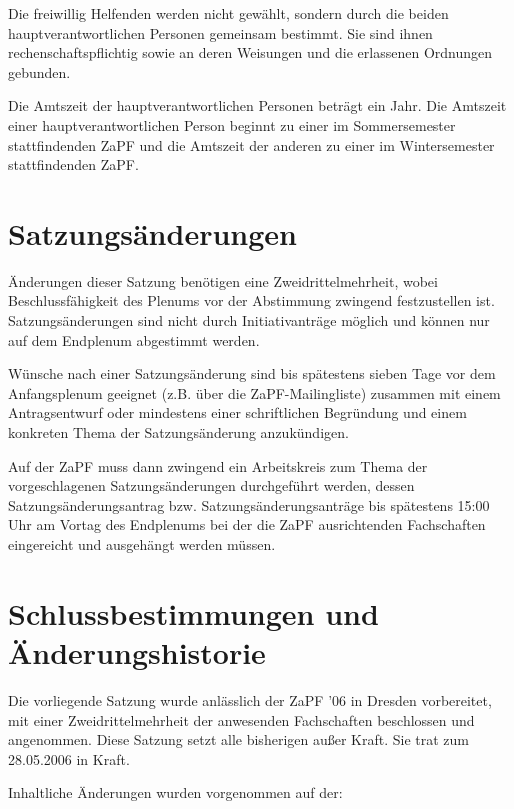 \documentclass[
  a4paper,
  oneside]{scrartcl}
\begin{document}
Die freiwillig Helfenden werden nicht gewählt, sondern durch die beiden
hauptverantwortlichen Personen gemeinsam bestimmt. Sie sind ihnen
rechenschaftspflichtig sowie an deren Weisungen und die erlassenen
Ordnungen gebunden.

Die Amtszeit der hauptverantwortlichen Personen beträgt ein Jahr. Die
Amtszeit einer hauptverantwortlichen Person beginnt zu einer im
Sommersemester stattfindenden ZaPF und die Amtszeit der anderen zu einer
im Wintersemester stattfindenden ZaPF.

\section{Satzungsänderungen}\label{satzungsuxe4nderungen}

Änderungen dieser Satzung benötigen eine Zweidrittelmehrheit, wobei
Beschlussfähigkeit des Plenums vor der Abstimmung zwingend festzustellen
ist. Satzungsänderungen sind nicht durch Initiativanträge möglich und
können nur auf dem Endplenum abgestimmt werden.

Wünsche nach einer Satzungsänderung sind bis spätestens sieben Tage vor
dem Anfangsplenum geeignet (z.B. über die ZaPF-Mailingliste) zusammen
mit einem Antragsentwurf oder mindestens einer schriftlichen Begründung
und einem konkreten Thema der Satzungsänderung anzukündigen.

Auf der ZaPF muss dann zwingend ein Arbeitskreis zum Thema der
vorgeschlagenen Satzungsänderungen durchgeführt werden, dessen
Satzungsänderungsantrag bzw. Satzungsänderungsanträge bis spätestens
15:00 Uhr am Vortag des Endplenums bei der die ZaPF ausrichtenden
Fachschaften eingereicht und ausgehängt werden müssen.

\section*{Schlussbestimmungen und
Änderungshistorie}\label{schlussbestimmungen-und-uxe4nderungshistorie}

Die vorliegende Satzung wurde anlässlich der ZaPF '06 in Dresden
vorbereitet, mit einer Zweidrittelmehrheit der anwesenden Fachschaften
beschlossen und angenommen. Diese Satzung setzt alle bisherigen außer
Kraft. Sie trat zum 28.05.2006 in Kraft.

Inhaltliche Änderungen wurden vorgenommen auf der:
\end{document}
